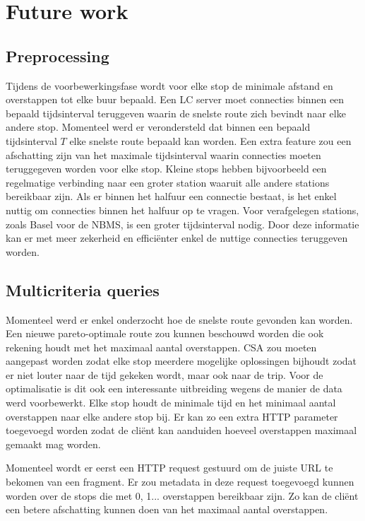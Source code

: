 \chapter{Future work}

\section{Preprocessing}
\label{max-interval}
Tijdens de voorbewerkingsfase wordt voor elke stop de minimale afstand en overstappen tot elke buur bepaald. Een LC server moet connecties binnen een bepaald tijdsinterval teruggeven waarin de snelste route zich bevindt naar elke andere stop. Momenteel werd er verondersteld dat binnen een bepaald tijdsinterval $T$ elke snelste route bepaald kan worden. Een extra feature zou een afschatting zijn van het maximale tijdsinterval waarin connecties moeten teruggegeven worden voor elke stop. Kleine stops hebben bijvoorbeeld een regelmatige verbinding naar een groter station waaruit alle andere stations bereikbaar zijn. Als er binnen het halfuur een connectie bestaat, is het enkel nuttig om connecties binnen het halfuur op te vragen. Voor verafgelegen stations, zoals Basel voor de NBMS, is een groter tijdsinterval nodig.
Door deze informatie kan er met meer zekerheid en effici\"enter enkel de nuttige connecties teruggeven worden.

\section{Multicriteria queries}

Momenteel werd er enkel onderzocht hoe de snelste route gevonden kan worden. Een nieuwe pareto-optimale route zou kunnen beschouwd worden die ook rekening houdt met het maximaal aantal overstappen. CSA zou moeten aangepast worden zodat elke stop meerdere mogelijke oplossingen bijhoudt zodat er niet louter naar de tijd gekeken wordt, maar ook naar de trip. Voor de optimalisatie is dit ook een interessante uitbreiding wegens de manier de data werd voorbewerkt. Elke stop houdt de minimale tijd en het minimaal aantal overstappen naar elke andere stop bij. Er kan zo een extra HTTP parameter toegevoegd worden zodat de cli\"ent kan aanduiden hoeveel overstappen maximaal gemaakt mag worden.

Momenteel wordt er eerst een HTTP request gestuurd om de juiste URL te bekomen van een fragment. Er zou metadata in deze request toegevoegd kunnen worden over de stops die met 0, 1... overstappen bereikbaar zijn. Zo kan de cli\"ent een betere afschatting kunnen doen van het maximaal aantal overstappen.

